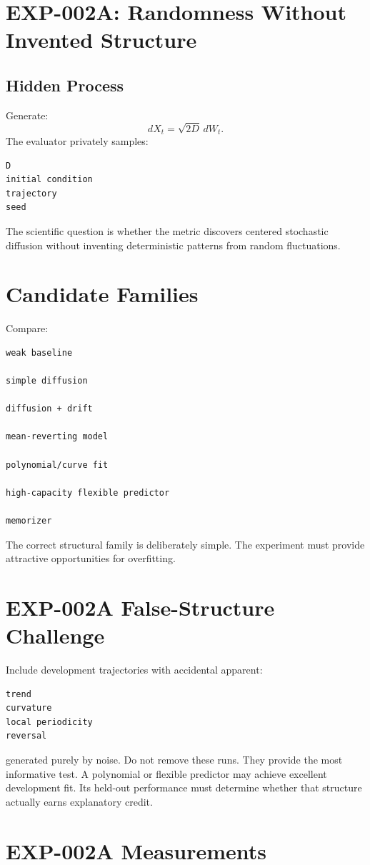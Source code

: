 \documentclass[11pt]{article}
\begin{document}
\section{EXP-002A: Randomness Without Invented Structure}

\subsection{Hidden Process}

Generate:
\[
dX_t=\sqrt{2D}\,dW_t.
\]
The evaluator privately samples:
\begin{verbatim}
D
initial condition
trajectory
seed
\end{verbatim}
The scientific question is whether the metric discovers centered stochastic diffusion without inventing deterministic patterns from random fluctuations.

\section{Candidate Families}

Compare:
\begin{verbatim}
weak baseline

simple diffusion

diffusion + drift

mean-reverting model

polynomial/curve fit

high-capacity flexible predictor

memorizer
\end{verbatim}
The correct structural family is deliberately simple. The experiment must provide attractive opportunities for overfitting.

\section{EXP-002A False-Structure Challenge}

Include development trajectories with accidental apparent:
\begin{verbatim}
trend
curvature
local periodicity
reversal
\end{verbatim}
generated purely by noise. Do not remove these runs. They provide the most informative test. A polynomial or flexible predictor may achieve excellent development fit. Its held-out performance must determine whether that structure actually earns explanatory credit.

\section{EXP-002A Measurements}
\end{document}
